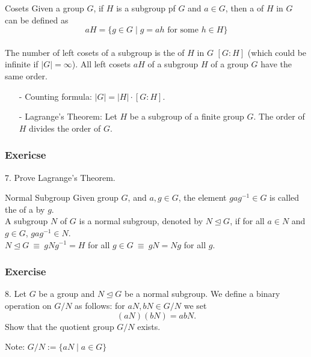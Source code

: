 \documentclass{beamer}
\begin{document}
\begin{frame}{Cosets}
    \hh Given a group $G$, if $H$ is a subgroup pf $G$ and $a \in G$, 
    then a  of $H$ in $G$ can be defined as
    $$
    a H=\{g \in G \mid g=ah \text { for some } h \in H\}
    $$
    \\ 
    \hh The number of left cosets of a subgroup is the  of $H$ in $G$ $[G : H]$ (which could be infinite if $|G| = \infty$). All left cosets $aH$ of a subgroup $H$ of a group $G$ have the same order.
    \begin{itemize}
        \item[-]Counting formula: $|G| = |H| \cdot [G : H].$
        \item[-]Lagrange's Theorem: Let $H$ be a subgroup of a finite group $G$. The order of $H$ divides the order of $G$.
    \end{itemize}
    \par 
\end{frame}
\begin{frame}
    \frametitle{Exericse}
    7. Prove Lagrange's Theorem.
    \vs{15em}

\end{frame}
\begin{frame}{Normal Subgroup}
    \hh Given group $G$, and $a, g \in G$, the element $gag^{-1} \in G$ is called the
     of a by $g$.
    \\ \vv \hh
     A subgroup $N$ of $G$ is a normal subgroup, denoted by $N \unlhd G$, if for all $a \in N$ and $g \in G$, $gag^{-1} \in N$. 
    \\ \vv \hh 
     $N \unlhd G \ \equiv \ gNg^{-1} = H$ for all $g \in G \ \equiv \ gN = Ng$ for all $g$.
\end{frame}
\begin{frame}
    \frametitle{Exercise}
    8. Let $G$ be a group and $N \unlhd G$ be a normal 
    subgroup. We define a binary operation on $G/N$ as follows: 
    for $aN, bN \in G/N$ we set $$(aN)(bN) = abN.$$ 
    Show that the quotient group $G/N$ exists.
	\par \vs{2em}
    Note: $G / N := \{aN \mid a \in G \}$  %
\end{frame}
\end{document}
